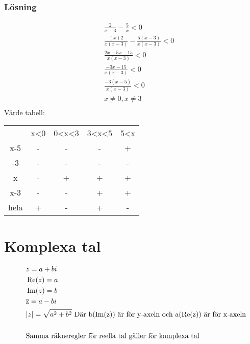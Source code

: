 \subsubsection{Lösning}
\begin{align*}
&\quad \frac{ 2 }{ x - 3 } - \frac{ 5 }{ x } < 0 \\
&\quad \frac{(x) 2 }{x (x - 3)} - \frac{ 5 ( x - 3 )}{ x ( x - 3 ) } < 0 \\
&\quad \frac{ 2 x - 5 x - 15 }{ x ( x - 3 ) } < 0 \\
&\quad \frac{ - 3 x - 15 }{ x ( x - 3 ) } < 0 \\
&\quad \frac{ - 3 ( x - 5 ) }{ x ( x - 3 ) } < 0 \\
&\quad  x \neq 0 , x \neq 3 \\
\end{align*}
Värde tabell:
\begin{center}
\begin{tabular}{ |c|c|c|c|c| } 
 \hline
        & x<0   & 0<x<3 & 3<x<5 & 5<x   \\ 
 x-5    & -     & -     & -     & +     \\ 
 -3     & -     & -     & -     & -     \\  
 x      & -     & +     & +     & +     \\ 
 x-3    & -     & -     & +     & +     \\ 
 hela   & +     & -     & +     & -     \\ 
 \hline
\end{tabular}
\end{center}



\section{Komplexa tal}
\begin{align*}
&\quad z = a + bi \\
&\quad \operatorname{Re}(z) = a \\
&\quad \operatorname{Im}(z) = b \\
&\quad \overline{\rm z}= a - b i \\
&\quad | z | = \sqrt{a^ { 2 } + b^ { 2 }} \text{  Där b(Im(z)) är för y-axeln och a(Re(z)) är för x-axeln} \\
&\quad  \\
&\quad \text{Samma räkneregler för reella tal gäller för komplexa tal} \\
\end{align*}


